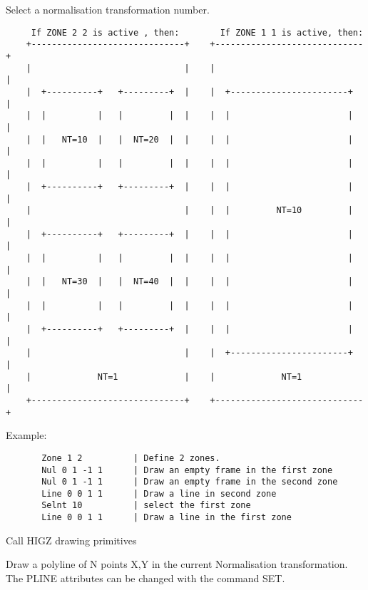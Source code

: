    \par
Select a normalisation transformation number.  
\begin{verbatim}
     If ZONE 2 2 is active , then:        If ZONE 1 1 is active, then:
    +------------------------------+    +-----------------------------+
    |                              |    |                             |
    |  +----------+   +---------+  |    |  +-----------------------+  |
    |  |          |   |         |  |    |  |                       |  |
    |  |   NT=10  |   |  NT=20  |  |    |  |                       |  |
    |  |          |   |         |  |    |  |                       |  |
    |  +----------+   +---------+  |    |  |                       |  |
    |                              |    |  |         NT=10         |  |
    |  +----------+   +---------+  |    |  |                       |  |
    |  |          |   |         |  |    |  |                       |  |
    |  |   NT=30  |   |  NT=40  |  |    |  |                       |  |
    |  |          |   |         |  |    |  |                       |  |
    |  +----------+   +---------+  |    |  |                       |  |
    |                              |    |  +-----------------------+  |
    |             NT=1             |    |             NT=1            |
    +------------------------------+    +-----------------------------+
\end{verbatim}
\ENDVERB
   \par
Example:  
\begin{verbatim}
       Zone 1 2          | Define 2 zones.
       Nul 0 1 -1 1      | Draw an empty frame in the first zone
       Nul 0 1 -1 1      | Draw an empty frame in the second zone
       Line 0 0 1 1      | Draw a line in second zone
       Selnt 10          | select the first zone
       Line 0 0 1 1      | Draw a line in the first zone
\end{verbatim}

\ENDCMD
{}
\ifMENUtext
   \par
Call HIGZ drawing primitives 


\fi


\BEGARG
{}
\ENDARG

   \par
Draw a polyline of N points X,Y in the current Normalisation 
   transformation.  The PLINE attributes can be changed with the command SET.  


